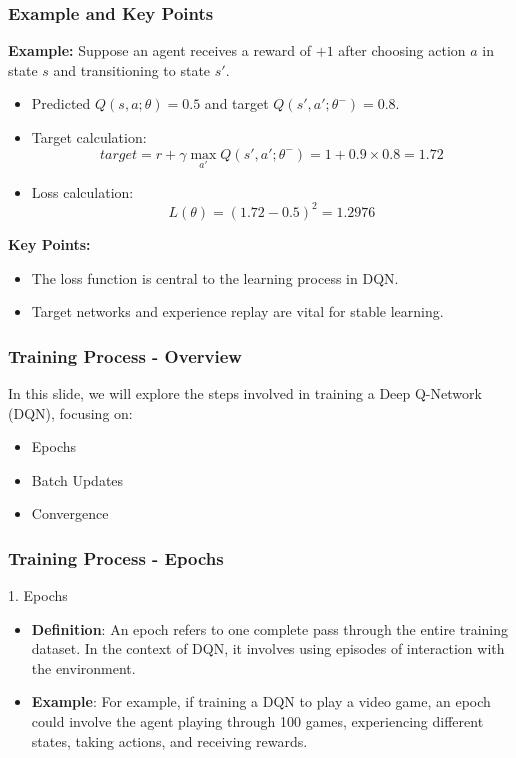 \documentclass{beamer}
\begin{document}
\begin{frame}[fragile]
    \frametitle{Example and Key Points}
    \textbf{Example:} Suppose an agent receives a reward of \( +1 \) after choosing action \( a \) in state \( s \) and transitioning to state \( s' \).
    
    \begin{itemize}
        \item Predicted \( Q(s, a; \theta) = 0.5 \) and target \( Q(s', a'; \theta^-) = 0.8 \).
        \item Target calculation:
        \begin{equation}
            target = r + \gamma \max_{a'}Q(s', a'; \theta^-) = 1 + 0.9 \times 0.8 = 1.72
        \end{equation}
        \item Loss calculation:
        \begin{equation}
            L(\theta) = (1.72 - 0.5)^2 = 1.2976
        \end{equation}
    \end{itemize}
    
    \textbf{Key Points:}
    \begin{itemize}
        \item The loss function is central to the learning process in DQN.
        \item Target networks and experience replay are vital for stable learning.
    \end{itemize}
\end{frame}

\begin{frame}[fragile]
    \frametitle{Training Process - Overview}
    In this slide, we will explore the steps involved in training a Deep Q-Network (DQN), focusing on:
    \begin{itemize}
        \item Epochs
        \item Batch Updates
        \item Convergence
    \end{itemize}
\end{frame}

\begin{frame}[fragile]
    \frametitle{Training Process - Epochs}
    \begin{block}{1. Epochs}
        \begin{itemize}
            \item \textbf{Definition}: An epoch refers to one complete pass through the entire training dataset. In the context of DQN, it involves using episodes of interaction with the environment.
            \item \textbf{Example}: For example, if training a DQN to play a video game, an epoch could involve the agent playing through 100 games, experiencing different states, taking actions, and receiving rewards.
        \end{itemize}
    \end{block}
\end{frame}
\end{document}
